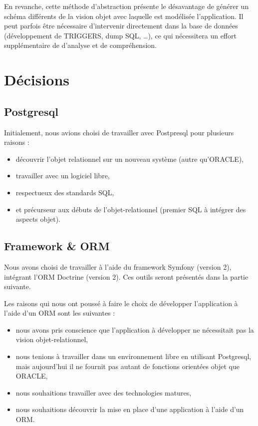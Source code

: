 En revanche, cette méthode d'abstraction présente le désavantage de générer un schéma différents de la vision objet avec laquelle est modélisée l'application. Il peut parfois être nécessaire d'intervenir directement dans la base de données (développement de TRIGGERS, dump SQL, \ldots), ce qui nécessitera un effort supplémentaire de d'analyse et de compréhension.

\section{Décisions}

\subsection{Postgresql}

Initialement, nous avions choisi de travailler avec Postpresql pour plusieurs raisons :
\begin{itemize}
\item découvrir l'objet relationnel sur un nouveau système (autre qu'ORACLE),
\item travailler avec un logiciel libre,
\item respectueux des standards SQL,
\item et précurseur aux débuts de l'objet-relationnel (premier SQL à intégrer des aspects objet).
\end{itemize}

\subsection{Framework \& ORM}

Nous avons choisi de travailler à l'aide du framework Symfony (version 2), intégrant l'ORM Doctrine (version 2). Ces outils seront présentés dans la partie suivante.

Les raisons qui nous ont poussé à faire le choix de développer l'application à l'aide d'un ORM sont les suivantes :
\begin{itemize}
\item nous avons pris conscience que l'application à développer ne nécessitait pas la vision objet-relationnel,
\item nous tenions à travailler dans un environnement libre en utilisant Postgresql, mais aujourd'hui il ne fournit pas autant de fonctions orientées objet que ORACLE,
\item nous souhaitions travailler avec des technologies matures,
\item nous souhaitions découvrir la mise en place d'une application à l'aide d'un ORM.
\end{itemize}
	
